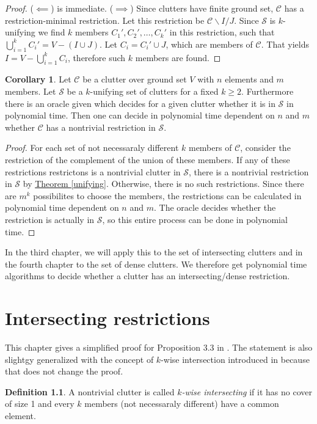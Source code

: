 \documentclass[a4paper, 12pt, twoside=false]{scrbook}
\theoremstyle{definition}
\newtheorem*{definition}{Definition}
\newtheorem{corollary}[theorem]{Corollary}
\begin{document}
   \begin{proof}
       ($\impliedby$) is immediate.
       ($\implies$) Since clutters have finite ground set, $\mathcal{C}$ has a restriction-minimal restriction.
       Let this restriction be $\mathcal{C}\backslash I / J$.
       Since $\mathcal{S}$ is $k$-unifying we find $k$ members $C_1', C_2', \ldots, C_k'$ in this restriction, such that $\bigcup_{i=1}^k C_i' = V - (I \cup J)$.
       Let $C_i = C_i' \cup J$, which are members of $\mathcal{C}$.
       That yields $I=V-\bigcup_{i=1}^k C_i$, therefore such $k$ members are found.
   \end{proof}
   \begin{corollary}
       Let $\mathcal{C}$ be a clutter over ground set $V$ with $n$ elements and $m$ members.
       Let $\mathcal{S}$ be a $k$-unifying set of clutters for a fixed $k\geq 2$.
       Furthermore there is an oracle given which decides for a given clutter whether it is in $\mathcal{S}$ in polynomial time.
       Then one can decide in polynomial time dependent on $n$ and $m$ whether $\mathcal{C}$ has a nontrivial restriction in $\mathcal{S}$.
   \end{corollary}

   \begin{proof}
       For each set of not necessaraly different $k$ members of $\mathcal{C}$, consider the restriction of the complement of the union of these members.
       If any of these restrictions restrictons is a nontrivial clutter in $\mathcal{S}$, there is a nontrivial restriction in $\mathcal{S}$ by \hyperref[unifying]{Theorem \ref*{unifying}}.
       Otherwise, there is no such restrictions.
       Since there are $m^k$ possibilites to choose the members, the restrictions can be calculated in polynomial time dependent on $n$ and $m$. The oracle decides whether the restriction is actually in $\mathcal{S}$, so this entire process can be done in polynomial time.
   \end{proof}

   In the third chapter, we will apply this to the set of intersecting clutters and in the fourth chapter to the set of dense clutters.
   We therefore get polynomial time algorithms to decide whether a clutter has an intersecting/dense restriction.

   \chapter{Intersecting restrictions}
   This chapter gives a simplified proof for Proposition 3.3 in \cite{restrictions}.
   The statement is also slightgy generalized with the concept of $k$-wise intersection introduced in \cite{k-wise} because that does not change the proof.
   \begin{definition}
       A nontrivial clutter is called \emph{$k$-wise intersecting} if it has no cover of size 1 and every $k$ members (not necessaraly different) have a common element.
   \end{definition}
\end{document}
